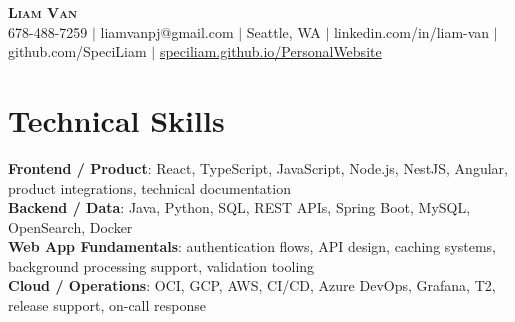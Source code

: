\documentclass[letterpaper,11pt]{article}
\begin{document}

%
\begin{center}
    \textbf{\Huge \scshape Liam Van} \\ \vspace{1pt}
    \small 678-488-7259 $|$ \small {liamvanpj@gmail.com} $|$ Seattle, WA
 {{$|$ linkedin.com/in/liam-van} {$|$ github.com/SpeciLiam} {$|$ \href{https://speciliam.github.io/PersonalWebsite}{speciliam.github.io/PersonalWebsite}}}

\end{center}

\section{Technical Skills}
 \begin{itemize}[leftmargin=0.15in, label={}]
    \small{\item{
     \textbf{Frontend / Product}{: React, TypeScript, JavaScript, Node.js, NestJS, Angular, product integrations, technical documentation} \\
     \textbf{Backend / Data}{: Java, Python, SQL, REST APIs, Spring Boot, MySQL, OpenSearch, Docker} \\
     \textbf{Web App Fundamentals}{: authentication flows, API design, caching systems, background processing support, validation tooling} \\
     \textbf{Cloud / Operations}{: OCI, GCP, AWS, CI/CD, Azure DevOps, Grafana, T2, release support, on-call response} \\
    }}
 \end{itemize}
%
\end{document}

